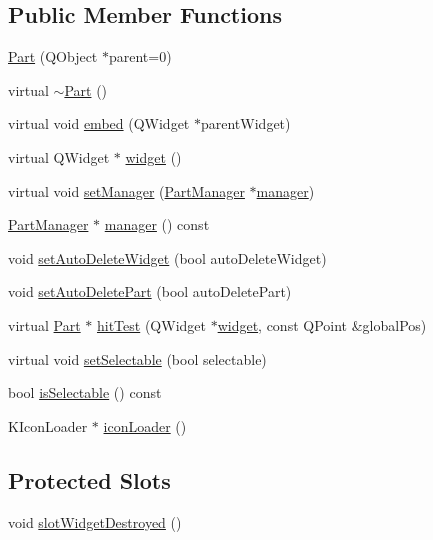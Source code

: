 \subsection*{\-Public \-Member \-Functions}
\begin{DoxyCompactItemize}
\item 
\hyperlink{classKParts_1_1Part_afa61f98b2c9b14cbf94f9b1e2b453597}{\-Part} (\-Q\-Object $\ast$parent=0)
\item 
virtual \hyperlink{classKParts_1_1Part_a339e7a12833cdd5d4820d69070ea458b}{$\sim$\-Part} ()
\item 
virtual void \hyperlink{classKParts_1_1Part_afb9d58b0de422a96a809abade83c3922}{embed} (\-Q\-Widget $\ast$parent\-Widget)
\item 
virtual \-Q\-Widget $\ast$ \hyperlink{classKParts_1_1Part_a134900cb0605a1cd5113d90954a01fdf}{widget} ()
\item 
virtual void \hyperlink{classKParts_1_1Part_afb87e3aed12cfdd6ecf057f916c7889f}{set\-Manager} (\hyperlink{classKParts_1_1PartManager}{\-Part\-Manager} $\ast$\hyperlink{classKParts_1_1Part_a06ea4dd249752f23229bc30b693eed44}{manager})
\item 
\hyperlink{classKParts_1_1PartManager}{\-Part\-Manager} $\ast$ \hyperlink{classKParts_1_1Part_a06ea4dd249752f23229bc30b693eed44}{manager} () const 
\item 
void \hyperlink{classKParts_1_1Part_a18a6e6b02d7d08a52314d5a7a2d0a3bd}{set\-Auto\-Delete\-Widget} (bool auto\-Delete\-Widget)
\item 
void \hyperlink{classKParts_1_1Part_a0af0172fc3b5c585524ca5e84af05017}{set\-Auto\-Delete\-Part} (bool auto\-Delete\-Part)
\item 
virtual \hyperlink{classKParts_1_1Part}{\-Part} $\ast$ \hyperlink{classKParts_1_1Part_a5398eb6687f7136e2c02ec7f6f5fd66e}{hit\-Test} (\-Q\-Widget $\ast$\hyperlink{classKParts_1_1Part_a134900cb0605a1cd5113d90954a01fdf}{widget}, const \-Q\-Point \&global\-Pos)
\item 
virtual void \hyperlink{classKParts_1_1Part_aa4841b2e2ddb43de60e28ede88151f33}{set\-Selectable} (bool selectable)
\item 
bool \hyperlink{classKParts_1_1Part_a6c3e8845a5836a790ab67cb360120cab}{is\-Selectable} () const 
\item 
\-K\-Icon\-Loader $\ast$ \hyperlink{classKParts_1_1Part_a8c41d16009e44a35ec3b7c5e6b4e0b80}{icon\-Loader} ()
\end{DoxyCompactItemize}
\subsection*{\-Protected \-Slots}
\begin{DoxyCompactItemize}
\item 
void \hyperlink{classKParts_1_1Part_a07231742bae75d6fc5712aaf45397b29}{slot\-Widget\-Destroyed} ()
\end{DoxyCompactItemize}
